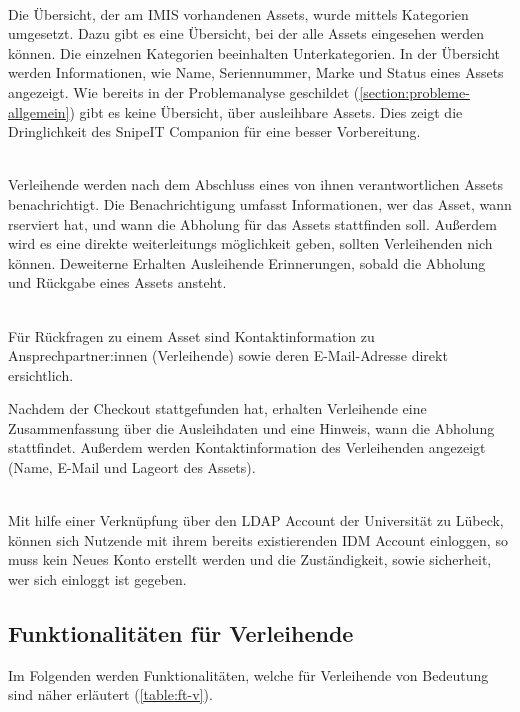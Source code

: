 {\sffamily\color{maincolor}{Ft-VA-1 | Übersicht über ausleihbare Assets }}\\
Die Übersicht, der am IMIS vorhandenen Assets, wurde mittels Kategorien
umgesetzt. Dazu gibt es eine Übersicht, bei der alle Assets eingesehen werden
können. Die einzelnen Kategorien beeinhalten Unterkategorien. In der Übersicht
werden Informationen, wie Name, Seriennummer, Marke und Status eines Assets
angezeigt. Wie bereits in der Problemanalyse geschildet
(\ref{section:probleme-allgemein}) gibt es keine Übersicht, über ausleihbare
Assets. Dies zeigt die Dringlichkeit des SnipeIT Companion für eine besser
Vorbereitung.

    {\sffamily\color{maincolor}{Ft-VA-2 | Benachrichtigungen \& Erinnerungen
        }}\\
Verleihende werden nach dem Abschluss eines von ihnen verantwortlichen Assets
benachrichtigt. Die Benachrichtigung umfasst Informationen, wer das Asset, wann
rserviert hat, und wann die Abholung für das Assets stattfinden soll. Außerdem
wird es eine direkte weiterleitungs möglichkeit geben, sollten Verleihenden nich
können. Deweiterne Erhalten Ausleihende Erinnerungen, sobald die Abholung und
Rückgabe eines Assets ansteht.

    {\sffamily\color{maincolor}{Ft-VA-3 | Sichtbarkeit von
            Ansprechpartner:innen}}\\
Für Rückfragen zu einem Asset sind Kontaktinformation zu Ansprechpartner:innen
(Verleihende) sowie deren E-Mail-Adresse direkt ersichtlich.

Nachdem der Checkout stattgefunden hat, erhalten Verleihende eine
Zusammenfassung über die Ausleihdaten und eine  Hinweis, wann die Abholung
stattfindet. Außerdem werden Kontaktinformation des Verleihenden angezeigt
(Name, E-Mail und Lageort des Assets).


    {\sffamily\color{maincolor}{Ft-VA-4 | Authentifizierung per IDM Account}}\\
Mit hilfe einer Verknüpfung über den LDAP Account der Universität zu Lübeck,
können sich Nutzende mit ihrem bereits existierenden IDM Account einloggen, so
muss kein Neues Konto erstellt werden und die Zuständigkeit, sowie sicherheit,
wer sich einloggt ist gegeben.

\subsection{Funktionalitäten für Verleihende}
Im Folgenden werden Funktionalitäten, welche für Verleihende von Bedeutung sind
näher erläutert (\ref{table:ft-v}).

